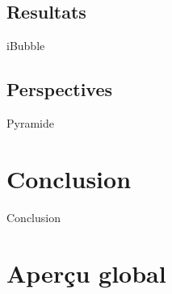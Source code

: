 \documentclass{bredelebeamer}
\begin{document}

	\subsection{Resultats}
\begin{frame}{iBubble}
\end{frame}

	\subsection{Perspectives}
\begin{frame}{Pyramide}
\end{frame}




\section{Conclusion}

\begin{frame}{Conclusion}
\end{frame}



\section{Aperçu global}
\end{document}
